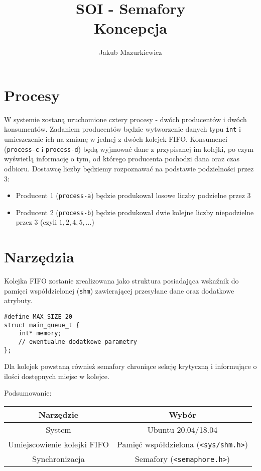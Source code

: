\documentclass[8pt,a4paper]{article}
\title{SOI - Semafory \\ \large Koncepcja}
\author{Jakub Mazurkiewicz}
\begin{document}
\maketitle

\section{Procesy}
W systemie zostaną uruchomione cztery procesy - dwóch producentów i dwóch konsumentów. Zadaniem producentów będzie wytworzenie danych typu \texttt{int} i umieszczenie ich na zmianę w jednej z dwóch kolejek FIFO. Konsumenci (\texttt{process-c} i \texttt{process-d}) będą wyjmować dane z przypisanej im kolejki, po czym wyświetlą informację o tym, od którego producenta pochodzi dana oraz czas odbioru. Dostawcę liczby będziemy rozpoznawać na podstawie podzielności przez 3:
\begin{itemize}
    \item Producent 1 (\texttt{process-a}) będzie produkował losowe liczby podzielne przez 3
    \item Producent 2 (\texttt{process-b}) będzie produkował dwie kolejne liczby niepodzielne przez 3 (czyli $1, 2, 4, 5, ...$)
\end{itemize}

\section{Narzędzia}
Kolejka FIFO zostanie zrealizowana jako struktura posiadająca wskaźnik do pamięci współdzielonej (\texttt{shm}) zawierającej przesyłane dane oraz dodatkowe atrybuty.

\begin{lstlisting}[style=CStyle]
#define MAX_SIZE 20
struct main_queue_t {
    int* memory;
    // ewentualne dodatkowe parametry
};
\end{lstlisting}

\noindent Dla kolejek powstaną również semafory chroniące sekcję krytyczną i informujące o ilości dostępnych miejsc w kolejce.

\noindent Podsumowanie:
\begin{table}[h!]
  \begin{center}
    \begin{tabular}{c|c}
      \textbf{Narzędzie} & \textbf{Wybór} \\
      \hline
      System & Ubuntu 20.04/18.04 \\
      Umiejscowienie kolejki FIFO & Pamięć współdzielona (\texttt{<sys/shm.h>}) \\
      Synchronizacja & Semafory (\texttt{<semaphore.h>}) \\
    \end{tabular}
  \end{center}
\end{table}
\end{document}
